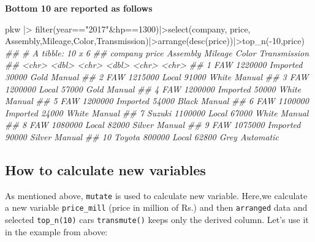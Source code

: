 \documentclass[
  letterpaper,
  DIV=11,
  numbers=noendperiod]{scrartcl}
\newenvironment{Shaded}{\begin{snugshade}}{\end{snugshade}}
\newcommand{\DecValTok}[1]{\textcolor[rgb]{0.68,0.00,0.00}{#1}}
\newcommand{\DocumentationTok}[1]{\textcolor[rgb]{0.37,0.37,0.37}{\textit{#1}}}
\newcommand{\FunctionTok}[1]{\textcolor[rgb]{0.28,0.35,0.67}{#1}}
\newcommand{\NormalTok}[1]{\textcolor[rgb]{0.00,0.23,0.31}{#1}}
\newcommand{\SpecialCharTok}[1]{\textcolor[rgb]{0.37,0.37,0.37}{#1}}
\newcommand{\StringTok}[1]{\textcolor[rgb]{0.13,0.47,0.30}{#1}}
\begin{document}
\textbf{Bottom 10 are reported as follows}

\begin{Shaded}
\begin{Highlighting}[]
\NormalTok{pkw }\SpecialCharTok{|\textgreater{}} \FunctionTok{filter}\NormalTok{(year}\SpecialCharTok{==}\StringTok{"2017"}\SpecialCharTok{\&}\NormalTok{hp}\SpecialCharTok{==}\DecValTok{1300}\NormalTok{)}\SpecialCharTok{|\textgreater{}}\FunctionTok{select}\NormalTok{(company, price, Assembly,Mileage,Color,Transmission)}\SpecialCharTok{|\textgreater{}}\FunctionTok{arrange}\NormalTok{(}\FunctionTok{desc}\NormalTok{(price))}\SpecialCharTok{|\textgreater{}}\FunctionTok{top\_n}\NormalTok{(}\SpecialCharTok{{-}}\DecValTok{10}\NormalTok{,price)}
\DocumentationTok{\#\# \# A tibble: 10 x 6}
\DocumentationTok{\#\#    company   price Assembly Mileage Color  Transmission}
\DocumentationTok{\#\#    \textless{}chr\textgreater{}     \textless{}dbl\textgreater{} \textless{}chr\textgreater{}      \textless{}dbl\textgreater{} \textless{}chr\textgreater{}  \textless{}chr\textgreater{}       }
\DocumentationTok{\#\#  1 FAW     1220000 Imported   30000 Gold   Manual      }
\DocumentationTok{\#\#  2 FAW     1215000 Local      91000 White  Manual      }
\DocumentationTok{\#\#  3 FAW     1200000 Local      57000 Gold   Manual      }
\DocumentationTok{\#\#  4 FAW     1200000 Imported   50000 White  Manual      }
\DocumentationTok{\#\#  5 FAW     1200000 Imported   54000 Black  Manual      }
\DocumentationTok{\#\#  6 FAW     1100000 Imported   24000 White  Manual      }
\DocumentationTok{\#\#  7 Suzuki  1100000 Local      67000 White  Manual      }
\DocumentationTok{\#\#  8 FAW     1080000 Local      82000 Silver Manual      }
\DocumentationTok{\#\#  9 FAW     1075000 Imported   90000 Silver Manual      }
\DocumentationTok{\#\# 10 Toyota   800000 Local      62800 Grey   Automatic}
\end{Highlighting}
\end{Shaded}

\hypertarget{how-to-calculate-new-variables}{%
\subsection{How to calculate new
variables}\label{how-to-calculate-new-variables}}

As mentioned above, \texttt{mutate} is used to calculate new variable.
Here,we calculate a new variable \texttt{price\_mill} (price in million
of Rs.) and then \texttt{arranged} data and selected \texttt{top\_n(10)}
cars \texttt{transmute()} keeps only the derived column. Let's use it in
the example from above:
\end{document}
